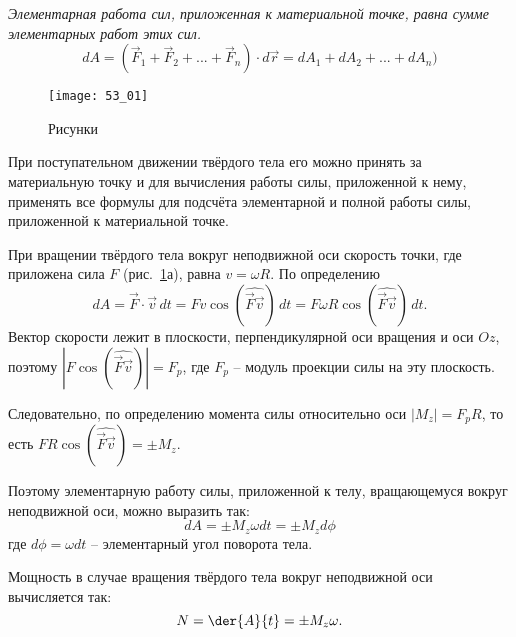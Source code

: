 

\emph{Элементарная работа сил, приложенная к материальной точке, равна сумме 
элементарных работ этих сил.}
\[ 
	dA = \left( \vec{F}_1 + \vec{F}_2 + ... + \vec{F}_n \right)\cdot d\vec{r} =
	dA_1 + dA_2 + ... + dA_n)
\]

\begin{figure}[h!]
	\center
    \texttt{[image: 53\_01]}
    \caption{Рисунки}
    \label{pic53_01}
\end{figure}

При поступательном движении твёрдого тела его можно принять за материальную 
точку и для вычисления работы силы, приложенной к нему, применять все 
формулы для подсчёта элементарной и полной работы силы, приложенной к 
материальной точке.

При вращении твёрдого тела вокруг неподвижной оси скорость точки, где приложена 
сила \( F \) (рис.~\ref{pic53_01}а), равна \( v = \omega R \). По определению
\[ 
	dA = \vec{F}\cdot\vec{v}\,dt = Fv\cos(\widehat{\vec{F}\vec{v}})\,dt = 
	F\omega R\cos(\widehat{\vec{F}\vec{v}})\,dt.
\]
Вектор скорости лежит в плоскости, перпендикулярной оси вращения и оси \( Oz \), 
поэтому \( |F\cos(\widehat{\vec{F}\vec{v}})| = F_p \), где \( F_p \) -- модуль проекции силы
на эту плоскость. 

Следовательно, по определению момента силы относительно оси 
\( |M_z| = F_p R\), то есть \( FR\cos(\widehat{\vec{F}\vec{v}}) = \pm M_z \).

Поэтому элементарную работу силы, приложенной к телу, вращающемуся вокруг 
неподвижной оси, можно выразить так:
\[
	dA = \pm M_z\omega dt = \pm M_zd\phi
\]
где \( d\phi = \omega dt \) -- элементарный угол поворота тела.

Мощность в случае вращения твёрдого тела вокруг неподвижной оси 
вычисляется так:
\[
	N = \der{A}{t} = \pm M_z\omega.
\]

